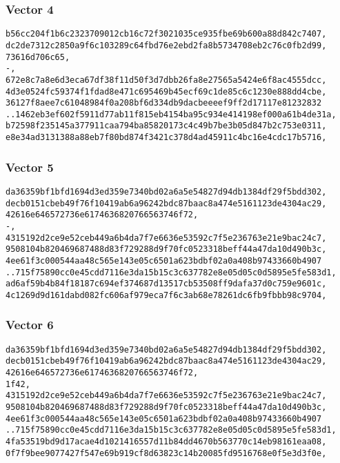 \documentclass[
]{article}
\begin{document}
\subsubsection{Vector 4}\label{vector-4}

\begin{verbatim}
b56cc204f1b6c2323709012cb16c72f3021035ce935fbe69b600a88d842c7407,
dc2de7312c2850a9f6c103289c64fbd76e2ebd2fa8b5734708eb2c76c0fb2d99,
73616d706c65,
-,
672e8c7a8e6d3eca67df38f11d50f3d7dbb26fa8e27565a5424e6f8ac4555dcc,
4d3e0524fc59374f1fdad8e471c695469b45ecf69c1de85c6c1230e888dd4cbe,
36127f8aee7c61048984f0a208bf6d334db9dacbeeeef9ff2d17117e81232832
..1462eb3ef602f5911d77ab11f815eb4154ba95c934e414198ef000a61b4de31a,
b72598f235145a377911caa794ba85820173c4c49b7be3b05d847b2c753e0311,
e8e34ad3131388a88eb7f80bd874f3421c378d4ad45911c4bc16e4cdc17b5716,
\end{verbatim}

\subsubsection{Vector 5}\label{vector-5}

\begin{verbatim}
da36359bf1bfd1694d3ed359e7340bd02a6a5e54827d94db1384df29f5bdd302,
decb0151cbeb49f76f10419ab6a96242bdc87baac8a474e5161123de4304ac29,
42616e646572736e6174636820766563746f72,
-,
4315192d2ce9e52ceb449a6b4da7f7e6636e53592c7f5e236763e21e9bac24c7,
9508104b820469687488d83f729288d9f70fc0523318beff44a47da10d490b3c,
4ee61f3c000544aa48c565e143e05c6501a623bdbf02a0a408b97433660b4907
..715f75890cc0e45cdd7116e3da15b15c3c637782e8e05d05c0d5895e5fe583d1,
ad6af59b4b84f18187c694ef374687d13517cb53508ff9dafa37d0c759e9601c,
4c1269d9d161dabd082fc606af979eca7f6c3ab68e78261dc6fb9fbbb98c9704,
\end{verbatim}

\subsubsection{Vector 6}\label{vector-6}

\begin{verbatim}
da36359bf1bfd1694d3ed359e7340bd02a6a5e54827d94db1384df29f5bdd302,
decb0151cbeb49f76f10419ab6a96242bdc87baac8a474e5161123de4304ac29,
42616e646572736e6174636820766563746f72,
1f42,
4315192d2ce9e52ceb449a6b4da7f7e6636e53592c7f5e236763e21e9bac24c7,
9508104b820469687488d83f729288d9f70fc0523318beff44a47da10d490b3c,
4ee61f3c000544aa48c565e143e05c6501a623bdbf02a0a408b97433660b4907
..715f75890cc0e45cdd7116e3da15b15c3c637782e8e05d05c0d5895e5fe583d1,
4fa53519bd9d17acae4d1021416557d11b84dd4670b563770c14eb98161eaa08,
0f7f9bee9077427f547e69b919cf8d63823c14b20085fd9516768e0f5e3d3f0e,
\end{verbatim}
\end{document}
